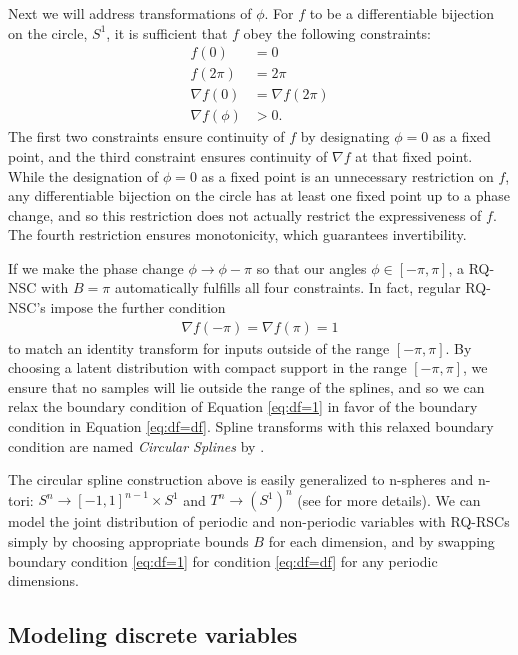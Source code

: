 \documentclass[twocolumn,twocolappendix,linenumbers]{aastex631}
\begin{document}
Next we will address transformations of $\phi$.
For $f$ to be a differentiable bijection on the circle, $S^1$, it is sufficient that $f$ obey the following constraints:
\begin{align}
    f(0) &= 0 \\
    f(2\pi) &= 2\pi \\
    \nabla f(0) &= \nabla f(2\pi) \label{eq:df=df} \\
    \nabla f(\phi) &> 0.
\end{align}
The first two constraints ensure continuity of $f$ by designating $\phi=0$ as a fixed point, and the third constraint ensures continuity of $\nabla f$ at that fixed point.
While the designation of $\phi=0$ as a fixed point is an unnecessary restriction on $f$, any differentiable bijection on the circle has at least one fixed point up to a phase change, and so this restriction does not actually restrict the expressiveness of $f$.
The fourth restriction ensures monotonicity, which guarantees invertibility.

If we make the phase change $\phi \to \phi - \pi$ so that our angles $\phi \in [-\pi, \pi]$, a RQ-NSC with $B=\pi$ automatically fulfills all four constraints.
In fact, regular RQ-NSC's impose the further condition
\begin{align}
    \nabla f(-\pi) = \nabla f(\pi) = 1 \label{eq:df=1}
\end{align}
to match an identity transform for inputs outside of the range $[-\pi, \pi]$.
By choosing a latent distribution with compact support in the range $[-\pi, \pi]$, we ensure that no samples will lie outside the range of the splines, and so we can relax the boundary condition of Equation \ref{eq:df=1} in favor of the boundary condition in Equation \ref{eq:df=df}.
Spline transforms with this relaxed boundary condition are named \emph{Circular Splines} by \citet{rezende2020}.

The circular spline construction above is easily generalized to n-spheres and n-tori: $S^n \to [-1, 1]^{n-1} \times S^1$ and $T^n \to (S^1)^n$ (see \citealt{rezende2020} for more details).
We can model the joint distribution of periodic and non-periodic variables with RQ-RSCs simply by choosing appropriate bounds $B$ for each dimension, and by swapping boundary condition \ref{eq:df=1} for condition \ref{eq:df=df} for any periodic dimensions.


\subsection{Modeling discrete variables}
\label{sec:discrete}
\end{document}
